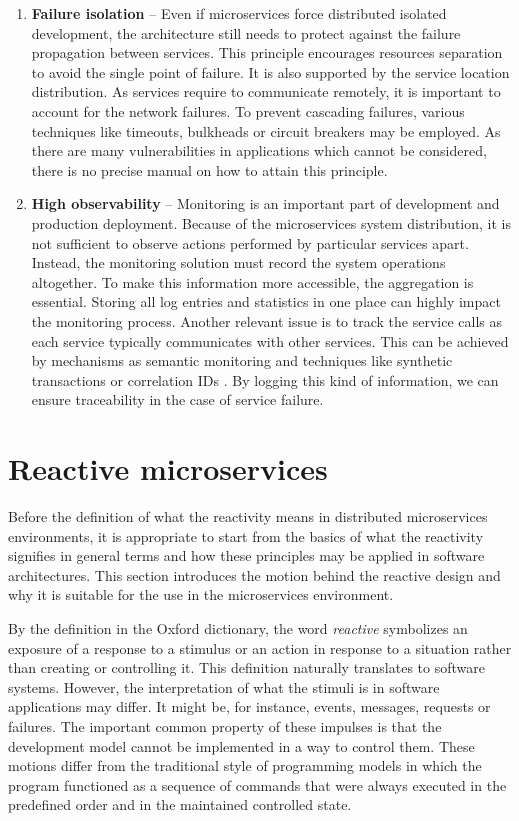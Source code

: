 \documentclass[oneside,
  digital, %
  table,   %
  lof,     %
  lot,     %
]{fithesis3}
\begin{document}
\begin{enumerate}
	\item \textbf{Failure isolation} -- Even if microservices force distributed isolated development, the architecture still needs to protect against the failure propagation between services. This principle encourages resources separation to avoid the single point of failure. It is also supported by the service location distribution. As services require to communicate remotely, it is important to account for the network failures. To prevent cascading failures, various techniques like timeouts, bulkheads or circuit breakers \cite{release_it} may be employed. As there are many vulnerabilities in applications which cannot be considered, there is no precise manual on how to attain this principle.
	
	\item \textbf{High observability} -- Monitoring is an important part of development and production deployment. Because of the microservices system distribution, it is not sufficient to observe actions performed by particular services apart. Instead, the monitoring solution must record the system operations altogether. To make this information more accessible, the aggregation is essential. Storing all log entries and statistics in one place can highly impact the monitoring process. Another relevant issue is to track the service calls as each service typically communicates with other services. This can be achieved by mechanisms as semantic monitoring and techniques like synthetic transactions or correlation IDs \cite{building_ms}. By logging this kind of information, we can ensure traceability in the case of service failure.
	
\end{enumerate}

\section{Reactive microservices}

Before the definition of what the reactivity means in distributed microservices environments, it is appropriate to start from the basics of what the reactivity signifies in general terms and how these principles may be applied in software architectures. This section introduces the motion behind the reactive design and why it is suitable for the use in the microservices environment.

By the definition in the Oxford dictionary, the word \textit{reactive} symbolizes an exposure of a response to a stimulus or an action in response to a situation rather than creating or controlling it. This definition naturally translates to software systems. However, the interpretation of what the stimuli is in software applications may differ. It might be, for instance, events, messages, requests or failures. The important common property of these impulses is that the development model cannot be implemented in a way to control them. These motions differ from the traditional style of programming models in which the program functioned as a sequence of commands that were always executed in the predefined order and in the maintained controlled state.
\end{document}
